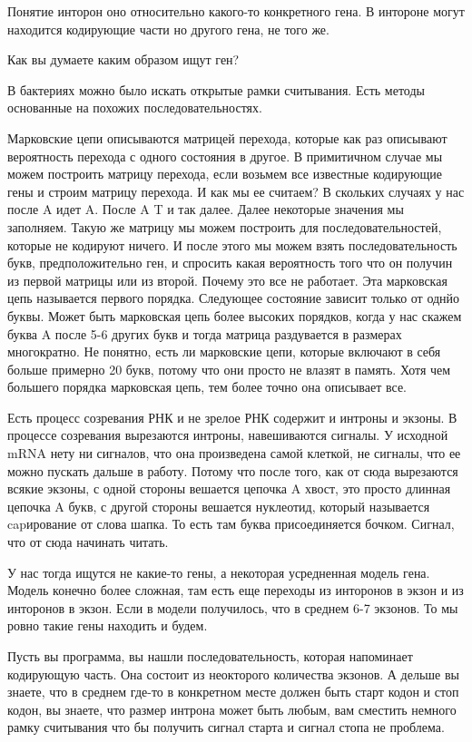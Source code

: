 Понятие инторон оно относительно какого-то конкретного гена. В интороне 
могут находится кодирующие части но другого гена, не того же. 

Как вы думаете каким образом ищут ген? 

В бактериях можно было искать открытые рамки считывания. Есть 
методы основанные на похожих последовательностях. 

Марковские цепи описываются матрицей перехода, которые как раз описывают 
вероятность перехода с одного состояния в другое. В примитичном случае 
мы можем построить матрицу перехода, если возьмем все известные кодирующие гены и 
строим матрицу перехода. 
И как мы ее считаем? В скольких случаях у нас после A идет A. После A T и так
далее. Далее некоторые значения мы заполняем. Такую же 
матрицу мы можем построить для последовательностей, которые не кодируют ничего. 
И после этого мы можем взять последовательность 
букв, предположительно ген, и спросить какая 
вероятность того что он получин из первой 
матрицы или из второй. Почему это все не работает. 
Эта марковская цепь называется первого порядка. 
Следующее состояние зависит только от однйо буквы. Может быть 
марковская цепь более высоких порядков, 
когда у нас скажем буква A после 5-6 других букв и 
тогда матрица раздувается в размерах 
многократно. Не понятно, есть ли 
марковские цепи, которые включают в себя больше примерно 20 букв, 
потому что они просто не влазят в память. Хотя чем большего 
порядка марковская цепь, тем 
более точно она описывает все. 

Есть процесс созревания РНК и не зрелое РНК содержит и интроны и экзоны. 
В процессе созревания 
вырезаются интроны, навешиваются сигналы. У исходной mRNA нету ни 
сигналов, что она произведена самой клеткой, 
не сигналы, что ее можно пускать дальше в работу. Потому что 
после того, как от сюда вырезаются всякие экзоны, с
одной стороны вешается цепочка A хвост, это просто 
длинная цепочка A букв, с другой стороны вешается нуклеотид, 
который называется capирование от слова шапка. То есть 
там буква присоединяется бочком. Сигнал, что от 
сюда начинать читать. 

У нас тогда ищутся не какие-то гены, а некоторая 
усредненная модель гена. Модель конечно более сложная, 
там есть еще переходы из инторонов в экзон и из 
инторонов в экзон. Если в модели получилось, что 
в среднем 6-7 экзонов. То мы ровно такие гены находить и будем. 

Пусть вы программа, вы нашли последовательность, которая 
напоминает кодирующую часть. Она состоит из неокторого 
количества экзонов. А дельше вы знаете, что 
в среднем где-то в конкретном месте должен быть старт кодон и стоп
кодон, вы знаете, что размер интрона может быть 
любым, вам сместить немного рамку считывания что бы 
получить сигнал старта и сигнал стопа не проблема. 

